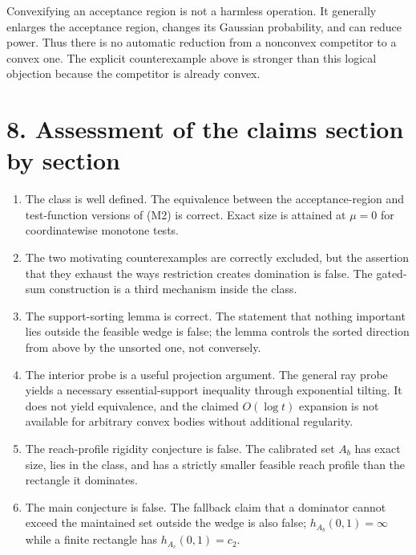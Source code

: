 \documentclass[12pt]{article}
\theoremstyle{definition}
\theoremstyle{remark}
\begin{document}
Convexifying an acceptance region is not a harmless operation.  It generally enlarges the acceptance region, changes its Gaussian probability, and can reduce power.  Thus there is no automatic reduction from a nonconvex competitor to a convex one.  The explicit counterexample above is stronger than this logical objection because the competitor is already convex.

\section*{8. Assessment of the claims section by section}

\begin{enumerate}[label=\textbf{Section \arabic*:},leftmargin=6.5em]
\item The class is well defined.  The equivalence between the acceptance-region and test-function versions of (M2) is correct.  Exact size is attained at $\mu=0$ for coordinatewise monotone tests.

\item The two motivating counterexamples are correctly excluded, but the assertion that they exhaust the ways restriction creates domination is false.  The gated-sum construction is a third mechanism inside the class.

\item The support-sorting lemma is correct.  The statement that nothing important lies outside the feasible wedge is false; the lemma controls the sorted direction from above by the unsorted one, not conversely.

\item The interior probe is a useful projection argument.  The general ray probe yields a necessary essential-support inequality through exponential tilting.  It does not yield equivalence, and the claimed $O(\log t)$ expansion is not available for arbitrary convex bodies without additional regularity.

\item The reach-profile rigidity conjecture is false.  The calibrated set $A_b$ has exact size, lies in the class, and has a strictly smaller feasible reach profile than the rectangle it dominates.

\item The main conjecture is false.  The fallback claim that a dominator cannot exceed the maintained set outside the wedge is also false; $h_{A_b}(0,1)=\infty$ while a finite rectangle has $h_{A_c}(0,1)=c_2$.
\end{enumerate}
\end{document}
